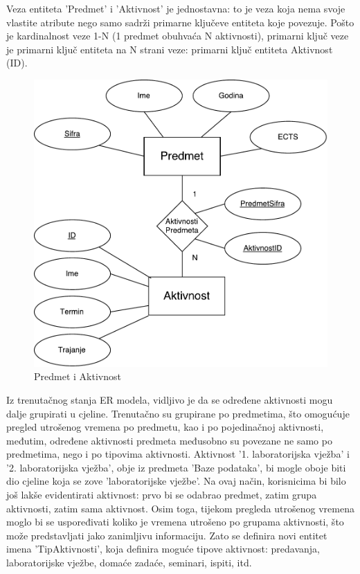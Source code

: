 \documentclass[times, utf8, zavrsni]{fer}
\begin{document}
Veza entiteta 'Predmet' i 'Aktivnost' je jednostavna: to je veza koja nema svoje vlastite atribute nego samo sadrži primarne ključeve entiteta koje povezuje. Pošto je kardinalnost veze 1-N (1 predmet obuhvaća N aktivnosti), primarni ključ veze je primarni ključ entiteta na N strani veze: primarni ključ entiteta Aktivnost (ID).

\begin{figure}[H]
\centering
\includegraphics[scale=0.7]{img/predmet-aktivnost.pdf}
\caption{Predmet i Aktivnost}
\label{fig:predmet-aktivnost}
\end{figure}

Iz trenutačnog stanja ER modela, vidljivo je da se određene aktivnosti mogu dalje grupirati u cjeline. Trenutačno su grupirane po predmetima, što omogućuje pregled utrošenog vremena po predmetu, kao i po pojedinačnoj aktivnosti, međutim, određene aktivnosti predmeta međusobno su povezane ne samo po predmetima, nego i po tipovima aktivnosti. Aktivnost '1. laboratorijska vježba' i '2. laboratorijska vježba', obje iz predmeta 'Baze podataka', bi mogle oboje biti dio cjeline koja se zove 'laboratorijske vježbe'. Na ovaj način, korisnicima bi bilo još lakše evidentirati aktivnost: prvo bi se odabrao predmet, zatim grupa aktivnosti, zatim sama aktivnost. Osim toga, tijekom pregleda utrošenog vremena moglo bi se uspoređivati koliko je vremena utrošeno po grupama aktivnosti, što može predstavljati jako zanimljivu informaciju. Zato se definira novi entitet imena 'TipAktivnosti', koja definira moguće tipove aktivnost: predavanja, laboratorijske vježbe, domaće zadaće, seminari, ispiti, itd.
\end{document}
